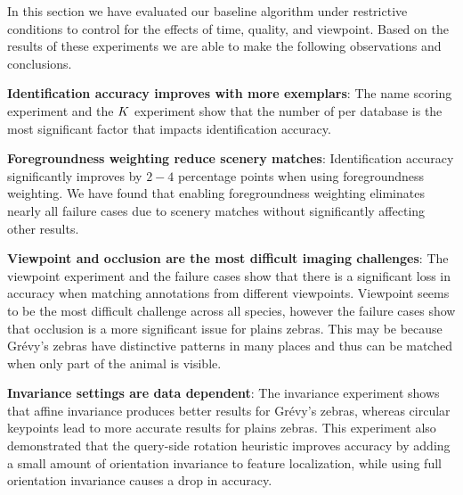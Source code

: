         In this section we have evaluated our baseline algorithm under restrictive conditions to control for the
          effects of time, quality, and viewpoint.
        Based on the results of these experiments we are able to make the following observations and conclusions.
        \begin{itemln}

            \item \textbf{Identification accuracy improves with more exemplars}:
            The name scoring experiment and the $K$ experiment show that the number of \exemplars{} per database
              \name{} is the most significant factor that impacts identification accuracy.

            \item \textbf{Foregroundness weighting reduce scenery matches}:
            Identification accuracy significantly improves by $2-4$ percentage points when using foregroundness
              weighting.
            We have found that enabling foregroundness weighting eliminates nearly all failure cases due to
              scenery matches without significantly affecting other results.

            \item \textbf{Viewpoint and occlusion are the most difficult imaging challenges}:
            The viewpoint experiment and the failure cases show that there is a significant loss in accuracy when
              matching annotations from different viewpoints.
            Viewpoint seems to be the most difficult challenge across all species, however the failure cases show
              that occlusion is a more significant issue for plains zebras.
            This may be because Grévy's zebras have distinctive patterns in many places and
              thus can be matched when only part of the animal is visible.

            \item \textbf{Invariance settings are data dependent}:
                The invariance experiment shows that
                affine invariance produces better results for Grévy's zebras, whereas circular
                  keypoints lead to more accurate results for plains zebras.
                This experiment also demonstrated that the query-side rotation heuristic improves accuracy by
                  adding a small amount of orientation invariance to feature localization, while using full
                  orientation invariance causes a drop in accuracy.


\end{itemln}
